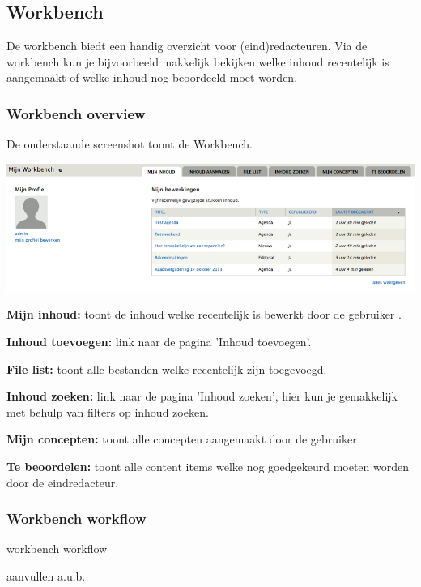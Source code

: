 \subsection{Workbench}\label{workbench}
De workbench biedt een handig overzicht voor (eind)redacteuren. Via de workbench kun je bijvoorbeeld makkelijk bekijken welke inhoud recentelijk is aangemaakt of welke inhoud nog beoordeeld moet worden.

\subsubsection{Workbench overview}\label{workbenchoverview}
De onderstaande screenshot toont de Workbench. 
\bigskip

\begin{center}
	\includegraphics[width=\textwidth]{img/workbench.png}
\end{center}

\textbf{Mijn inhoud:} toont de inhoud welke recentelijk is bewerkt door de gebruiker .

\textbf{Inhoud toevoegen:} link naar de pagina 'Inhoud toevoegen'.

\textbf{File list:} toont alle bestanden welke recentelijk zijn toegevoegd.

\textbf{Inhoud zoeken:} link naar de pagina 'Inhoud zoeken', hier kun je gemakkelijk met behulp van filters op inhoud zoeken.

\textbf{Mijn concepten:} toont alle concepten aangemaakt door de gebruiker 

\textbf{Te beoordelen:} toont alle content items welke nog goedgekeurd moeten worden door de eindredacteur.

\subsubsection{Workbench workflow}\label{workbenchworkflow}
workbench workflow

aanvullen a.u.b. 
